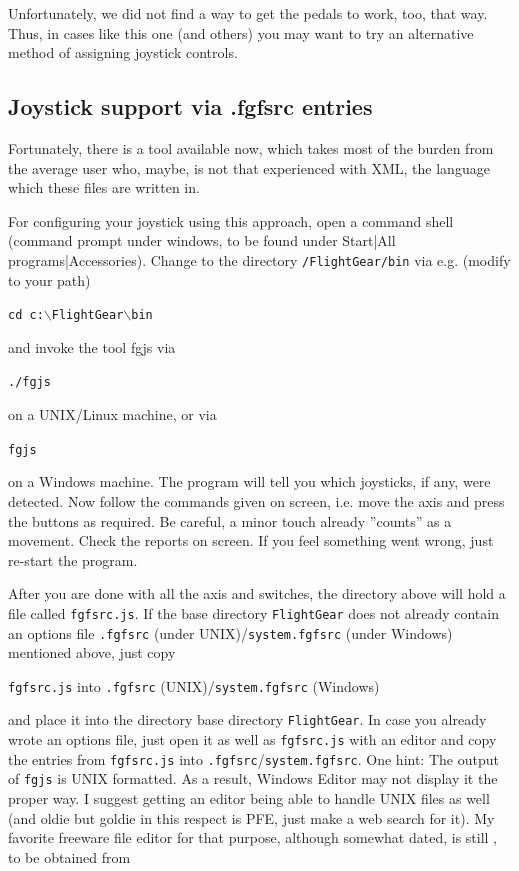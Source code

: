 Unfortunately, we did not find a way to get the pedals to work, too, that way. Thus, in cases like this one (and others) you may want to try an alternative method of assigning joystick controls.


\subsection{Joystick support via .fgfsrc entries\label{fgfsrcjoy}}
Fortunately, there is a tool available now, which takes most of the burden from the average user who, maybe, is not that experienced with XML, the language which these files are written in.

For configuring your joystick using this approach, open a command shell (command prompt under windows, to be found under Start|All programs|Accessories). Change to the directory \texttt{/FlightGear/bin} via e.g. (modify to your path) 

\noindent
\texttt{cd c:$\backslash$FlightGear$\backslash$bin}

and invoke the tool fgjs via

\noindent
\texttt{./fgjs}

on a UNIX/Linux machine, or via

\noindent
\texttt{fgjs}

on a Windows machine. The program will tell you which joysticks, if any, were detected. Now follow the commands given on screen, i.e. move the axis and press the buttons as required. Be careful, a minor touch already ''counts'' as a movement. Check the reports on screen. If you feel something went wrong, just re-start the program.

After you are done with all the axis and switches, the directory above will hold a file called \texttt{fgfsrc.js}. If the \FlightGear{} base directory \texttt{FlightGear} does not already contain an options file \texttt{.fgfsrc} (under UNIX)/\texttt{system.fgfsrc} (under Windows) mentioned above, just copy
\medskip

\noindent
 \texttt{fgfsrc.js} into \texttt{.fgfsrc} (UNIX)/\texttt{system.fgfsrc} (Windows) 
 \medskip

\noindent 
and place it into the directory \FlightGear{} base directory \texttt{FlightGear}. In case you already wrote an options file, just open it as well as \texttt{fgfsrc.js} with an editor and copy the entries from \texttt{fgfsrc.js} into \texttt{.fgfsrc}/\texttt{system.fgfsrc}. One hint: The output of \texttt{fgjs} is UNIX formatted. As a result, Windows Editor may not display it the proper way. I suggest getting an editor being able to handle UNIX files as well (and oldie but goldie in this respect is PFE, just make a web search for it). My favorite freeware file editor for that purpose, although somewhat dated, is still , to be obtained from


